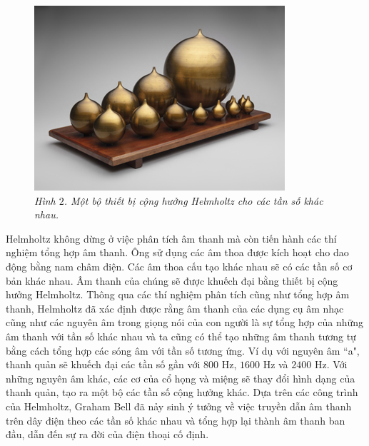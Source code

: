 \begin{multicols}{2}
	\begin{figure}[H]
		\centering
		\vspace*{-5pt}
		\captionsetup{labelformat= empty, justification=centering}
		\includegraphics[width=1\linewidth]{4}
		\caption{\small\textit{\color{timhieukhoahoc}Hình $2$. Một bộ thiết bị cộng hưởng Helmholtz cho các tần số khác nhau.}}
		\vspace*{-10pt}
	\end{figure}
	Helmholtz không dừng ở việc phân tích âm thanh mà còn tiến hành các thí nghiệm tổng hợp âm thanh. Ông sử dụng các âm thoa được kích hoạt cho dao động bằng nam châm điện. Các âm thoa cấu tạo khác nhau sẽ có các tần số cơ bản khác nhau. Âm thanh của chúng sẽ được khuếch đại bằng thiết bị cộng hưởng Helmholtz. Thông qua các thí nghiệm phân tích cũng như tổng hợp âm thanh, Helmholtz đã xác định được rằng âm thanh của các dụng cụ âm nhạc cũng như các nguyên âm trong giọng nói của con người là sự tổng hợp của những âm thanh với tần số khác nhau và ta cũng có thể tạo những âm thanh tương tự bằng cách tổng hợp các sóng âm với tần số tương ứng. Ví dụ với nguyên âm ``a", thanh quản sẽ khuếch đại các tần số gần với $800$ Hz, $1600$ Hz và $2400$ Hz. Với những nguyên âm khác, các cơ của cổ họng và miệng sẽ thay đổi hình dạng của thanh quản, tạo ra một bộ các tần số cộng hưởng khác. Dựa trên các công trình của Helmholtz, Graham Bell đã nảy sinh ý tưởng về việc truyền dẫn âm thanh trên dây điện theo các tần số khác nhau và tổng hợp lại thành âm thanh ban đầu, dẫn đến sự ra đời của điện thoại cố định.
	\begin{figure}[H]
		\centering
		\vspace*{-5pt}

\end{figure}
\end{multicols}
